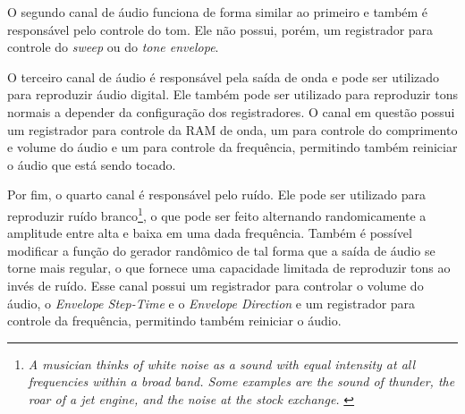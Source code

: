     O segundo canal de áudio funciona de forma similar ao primeiro e também é responsável pelo controle do tom. Ele não possui, porém, um registrador para controle do \textit{sweep} ou do \textit{tone envelope}.

    O terceiro canal de áudio é responsável pela saída de onda e pode ser utilizado para reproduzir áudio digital. Ele também pode ser utilizado para reproduzir tons normais a depender da configuração dos registradores. O canal em questão possui um registrador para controle da RAM de onda, um para controle do comprimento e volume do áudio e um para controle da frequência, permitindo também reiniciar o áudio que está sendo tocado.

    Por fim, o quarto canal é responsável pelo ruído. Ele pode ser utilizado para reproduzir ruído branco\footnote{\textit{A musician thinks of white noise as a sound with equal intensity at all frequencies within a broad band. Some examples are the sound of thunder, the roar of a jet engine, and the noise at the stock exchange.} \cite{kuo}}, o que pode ser feito alternando randomicamente a amplitude entre alta e baixa em uma dada frequência. Também é possível modificar a função do gerador randômico de tal forma que a saída de áudio se torne mais regular, o que fornece uma capacidade limitada de reproduzir tons ao invés de ruído. Esse canal possui um registrador para controlar o volume do áudio, o \textit{Envelope Step-Time} e o \textit{Envelope Direction} e um registrador para controle da frequência, permitindo também reiniciar o áudio.
